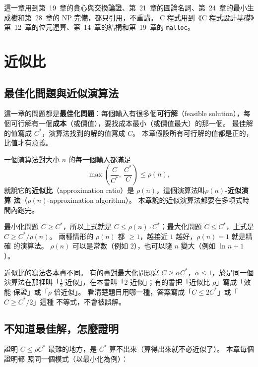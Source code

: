 這一章用到第~19~章的貪心與交換論證、第~21~章的圖論名詞、第~24~章的最小生成樹和第~28~章的 NP
完備，都只引用，不重講。 C 程式用到《C 程式設計基礎》第~12~章的位元運算、第~14~章的結構和第~19~章的
\texttt{malloc}。

\section{近似比}
\label{sec:apx-ratio}

\subsection{最佳化問題與近似演算法}

這一章的問題都是\textbf{最佳化問題}：每個輸入有很多個\textbf{可行解}（feasible solution），每
個可行解有一個\textbf{成本}（或價值），要找成本最小（或價值最大）的那一個。 最佳解的值寫成
$C^*$，演算法找到的解的值寫成 $C$。 本章假設所有可行解的值都是正的，比值才有意義。

\begin{definition}[近似比]
\label{def:apx-ratio}
一個演算法對大小 $n$ 的每一個輸入都滿足
\[
\max\left(\frac{C}{C^*},\ \frac{C^*}{C}\right) \le \rho(n),
\]
就說它的\textbf{近似比}（approximation ratio）是 $\rho(n)$，這個演算法叫\textbf{$\rho(n)$-近似演算
法}（$\rho(n)$-approximation algorithm）。 本章說的近似演算法都要在多項式時間內跑完。
\end{definition}

最小化問題 $C \ge C^*$，所以上式就是 $C \le \rho(n) \cdot C^*$；最大化問題 $C \le C^*$，上式是
$C \ge C^* / \rho(n)$。 兩種情形的 $\rho(n)$ 都 $\ge 1$，越接近 $1$ 越好，$\rho(n) = 1$ 就是精確
的演算法。 $\rho(n)$ 可以是常數（例如 $2$），也可以隨 $n$ 變大（例如 $\ln n + 1$）。

\begin{examnote}
近似比的寫法各本書不同。 有的書對最大化問題寫 $C \ge \alpha C^*$，$\alpha \le 1$，於是同一個
演算法在那裡叫「$\frac12$-近似」，在本書叫「$2$-近似」；有的書把「近似比 $\rho$」寫成「效能
保證」或「$\rho$ 倍近似」。 看清楚題目用哪一種，答案寫成「$C \le 2C^*$」或「$C \ge C^*/2$」這種
不等式，不會被誤解。
\end{examnote}

\subsection{不知道最佳解，怎麼證明}

證明 $C \le \rho C^*$ 最難的地方，是 $C^*$ 算不出來（算得出來就不必近似了）。 本章每個證明都
照同一個模式（以最小化為例）：

